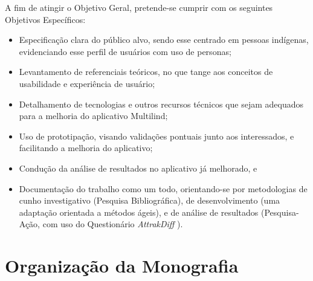 \begin{description}
    \item A fim de atingir o Objetivo Geral, pretende-se cumprir com os seguintes Objetivos Específicos:
          \begin{itemize}
              \item Especificação clara do público alvo, sendo esse centrado em pessoas indígenas, evidenciando esse perfil de usuários com uso de personas;

              \item Levantamento de referenciais teóricos, no que tange aos conceitos de usabilidade e experiência de usuário;

              \item Detalhamento de tecnologias e outros recursos técnicos que sejam adequados para a melhoria do aplicativo Multilind;

              \item Uso de prototipação, visando validações pontuais junto aos interessados, e facilitando a melhoria do aplicativo;

              \item Condução da análise de resultados no aplicativo já melhorado, e
              
              \item Documentação do trabalho como um todo, orientando-se por metodologias de cunho investigativo (Pesquisa Bibliográfica), de desenvolvimento 
              (uma adaptação orientada a métodos ágeis), e de análise de resultados (Pesquisa-Ação, com uso do Questionário \textit{AttrakDiff} \cite{natashatayana2015}
              \cite{hassenzahl2003}).
          \end{itemize}
\end{description}

\section{Organização da Monografia}
\label{sec:OrganizacaodaMonografia}


